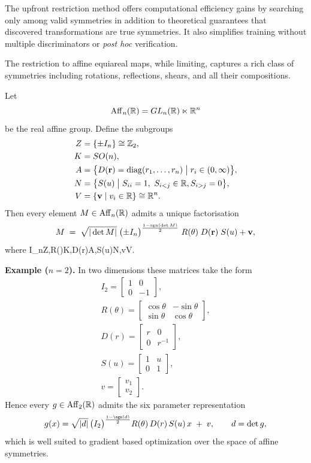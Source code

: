     The upfront restriction method offers computational efficiency gains by searching only among valid symmetries in addition to theoretical guarantees that discovered transformations are true symmetries.
    It also simplifies training without multiple discriminators or \textit{post hoc} verification.

    The restriction to affine equiareal maps, while limiting, captures a rich class of symmetries including rotations, reflections, shears, and all their compositions.
\begin{theorem}
\label{thm:iwasawa_affine}
Let 
\[
    \operatorname{Aff}_n(\mathbb{R})= GL_n(\mathbb{R})\ltimes\mathbb{R}^n
\]
be the real affine group.  Define the subgroups
\[
\begin{aligned}
Z &= \{\pm I_n\}\cong \mathbb{Z}_2,\\
K &= SO(n),\\
A &= \bigl\{D(\vb r)=\operatorname{diag}(r_1,\dots,r_n)\;\big|\;r_i\in(0,\infty)\bigr\},\\
N &= \bigl\{S(u) \;\big|\;S_{ii}=1,\ S_{i < j}\in\mathbb{R}, S_{i>j}=0\bigr\},\\
V &= \qty{\vb v \mid v_i\in\mathbb{R}}\cong\mathbb{R}^n.
\end{aligned}
\]
Then every element $M\in\operatorname{Aff}_n(\mathbb{R})$ admits a unique factorisation
\[
M \;=\;
\sqrt{|\det M|}\;\bigl(\pm I_n\bigr)^{\frac{1-\text{sgn}(\det M)}{2}}
\;R(\vb\theta)\;D(\vb r)\;S(u) + \vb v,
\]
where
\)
\pm I_n\in Z,\quad R(\vb\theta)\in K,\quad D(\vb r)\in A,\quad S(u)\in N,\quad \vb v\in V.
\)
\end{theorem}
\noindent\textbf{Example (}\(n=2\)\textbf{).}  In two dimensions these matrices take the form
\begin{gather}
I_2=\begin{bmatrix}1&0\\0&-1\end{bmatrix},\\
R(\theta)=\begin{bmatrix}\cos\theta & -\sin\theta\\
\sin\theta & \cos\theta\end{bmatrix},\\
D(r)=\begin{bmatrix}r & 0\\0 & r^{-1}\end{bmatrix},\\
S(u)=\begin{bmatrix}1 & u\\0 & 1\end{bmatrix},\\
v=\begin{bmatrix}v_1\\v_2\end{bmatrix}.
\end{gather}
Hence every $g\in\operatorname{Aff}_2(\mathbb{R})$ admits the six parameter representation
\[
g(x)=\sqrt{|d|}\,\bigl(I_2\bigr)^{\frac{1-\sgn(d)}{2}}
R(\theta)\,D(r)\,S(u)\,x \;+\;v,
\qquad d=\det g,
\]
which is well suited to gradient based optimization over the space of affine symmetries.

